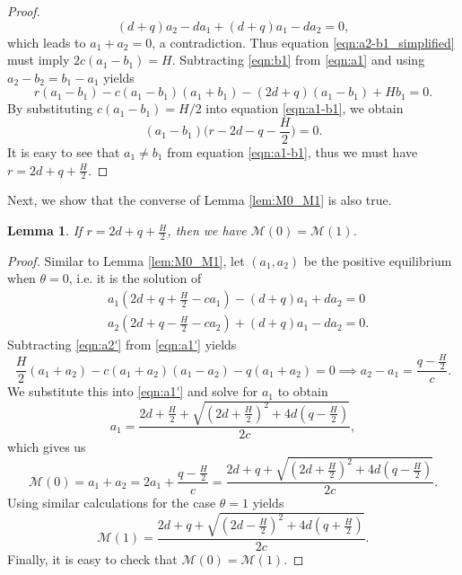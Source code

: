 \documentclass[11pt]{article}
\newtheorem{lemma}[theorem]{Lemma}
\def\MM{\mathcal{M}}
\theoremstyle{definition}
\begin{document}
\begin{proof}
    \[
    (d+q)a_2-da_1 + (d+q)a_1 -da_2=0,
    \]
    which leads to $a_1+a_2=0$, a contradiction. Thus equation \eqref{eqn:a2-b1_simplified} must imply $2c(a_1-b_1)=H$. Subtracting \eqref{eqn:b1} from \eqref{eqn:a1} and using $a_2-b_2=b_1-a_1$ yields
    \begin{equation}\label{eqn:a1-b1}
    r(a_1-b_1)-c(a_1-b_1)(a_1+b_1) -(2d+q)(a_1-b_1)+Hb_1=0.
    \end{equation}
    By substituting $c(a_1-b_1)=H/2$ into equation \eqref{eqn:a1-b1}, we obtain
    \[
    (a_1-b_1)\bigg(r-2d-q-\frac{H}{2}\bigg)=0.
    \]
    It is easy to see that $a_1\neq b_1$ from equation \eqref{eqn:a1-b1}, thus we must have $r=2d+q+\frac{H}{2}$.
\end{proof}

Next, we show that the converse of Lemma \ref{lem:M0_M1} is also true.

\begin{lemma}\label{lem:M0_M1_converse}
If $r=2d+q+\frac{H}{2}$, then we have $\MM(0)=\MM(1)$.    
\end{lemma}
\begin{proof}
Similar to Lemma \ref{lem:M0_M1}, let $(a_1,a_2)$ be the positive equilibrium when $\theta=0$, i.e. it is the solution of
\begin{subequations}
    \begin{align}
        &a_1(2d+q+\frac{H}{2}-c a_1)-(d+q)a_1+da_2=0\label{eqn:a1'}\\
        &a_2(2d+q-\frac{H}{2}-ca_2)+(d+q)a_1-da_2=0.\label{eqn:a2'}
    \end{align}   
    \end{subequations}
Subtracting \eqref{eqn:a2'} from \eqref{eqn:a1'} yields
\[
\frac{H}{2}(a_1+a_2)-c(a_1+a_2)(a_1-a_2) - q(a_1+a_2)=0 \implies a_2-a_1=\frac{q-\frac{H}{2}}{c}.
\]
We substitute this into \eqref{eqn:a1'} and solve for $a_1$ to obtain
\[
a_1=\frac{2d+\frac{H}{2}+\sqrt{(2d+\frac{H}{2})^2+4d(q-\frac{H}{2})}}{2c},
\]
which gives us
\[
\MM(0)=a_1+a_2=2a_1+\frac{q-\frac{H}{2}}{c}=\frac{2d+q+\sqrt{(2d+\frac{H}{2})^2+4d(q-\frac{H}{2})}}{2c}.
\]
Using similar calculations for the case $\theta=1$ yields 
\[
\MM(1)=\frac{2d+q+\sqrt{(2d-\frac{H}{2})^2+4d(q+\frac{H}{2})}}{2c}.
\]
Finally, it is easy to check that $\MM(0)=\MM(1)$.
\end{proof}
\end{document}
